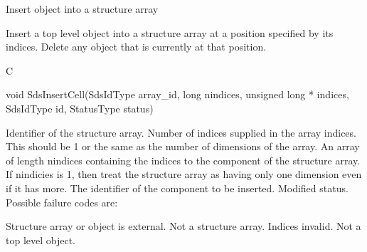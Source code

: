 \begin{manroutinedescription}
      Insert object into a structure array

      Insert a top level object into a structure array at a position specified %
by its
      indices. Delete any object that is currently at that position.
 
      C

      void SdsInsertCell(SdsIdType array\_{}id, long nindices, unsigned long *%
indices,
               SdsIdType id, StatusType {\mantt{*}} {} status)
 
\begin{manparametertable}
 Identifier of the %
structure array.
  Number of indices supplied in %
the
                            array indices. This should be 1 or the same as
                            the number of dimensions of the array.
  An array of length %
nindices containing
                            the indices to the component of the structure
                            array.  If nindicies is 1, then treat the
			    structure array as having only one dimension even
			    if it has more.
 The identifier of the component %
to be inserted.
 Modified status. Possible %
failure codes are:
\end{manparametertable}
\begin{mantwocolumntable}
Structure array or object is %
external.
Not a structure array.
Indices invalid.
Not a top level object.
\end{mantwocolumntable}
\end{manroutinedescription}
